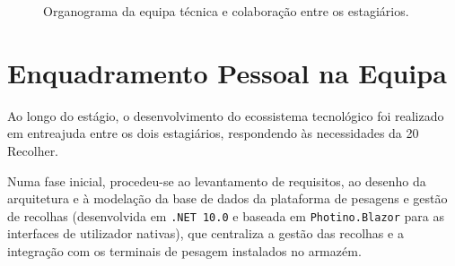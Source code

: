 \begin{figure}[H]
    \centering

    \caption{Organograma da equipa técnica e colaboração entre os estagiários.}
    \label{fig:organograma}
\end{figure}

\section{Enquadramento Pessoal na Equipa}
Ao longo do estágio, o desenvolvimento do ecossistema tecnológico foi realizado em entreajuda entre os dois estagiários, respondendo às necessidades da 20 Recolher.

Numa fase inicial, procedeu-se ao levantamento de requisitos, ao desenho da arquitetura e à modelação da base de dados da plataforma de pesagens e gestão de recolhas (desenvolvida em \texttt{.NET 10.0} e baseada em \texttt{Photino.Blazor} para as interfaces de utilizador nativas), que centraliza a gestão das recolhas e a integração com os terminais de pesagem instalados no armazém.

